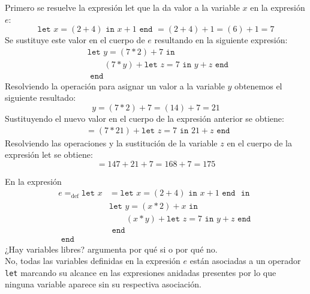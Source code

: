 \begin{exercise}
        Primero se resuelve la expresión let que la da valor a la variable $x$ en la expresión $e$:
        \[
            \texttt{let }x = (2 + 4) \texttt{ in } x+1 \texttt{ end } 
             = (2+4) + 1 
             = (6) + 1
             = 7
        \]
        Se sustituye este valor en el cuerpo de $e$ resultando en la siguiente expresión:
        \begin{align*}
           & \texttt{let }y =(7 \ast 2)+7  \texttt{ in } \\
            & \qquad (7\ast y) + \texttt{let }z=7 \texttt{ in } y+z \texttt{ end }\\
            & \texttt{ end }
        \end{align*}
        Resolviendo la operación para asignar un valor a la variable $y$ obtenemos el siguiente resultado: 
        \[
            y = (7 \ast 2) + 7 
            = (14) + 7 
            = 21
        \]
        Sustituyendo el nuevo valor en el cuerpo de la expresión anterior se obtiene:
        \begin{align*}
                 & = (7 \ast 21) + \texttt{let } z=7 \texttt{ in } 21 + z \texttt{ end }
        \end{align*}
        Resolviendo las operaciones y la sustitución de la variable $z$ en el cuerpo de la expresión let se obtiene:
        \[
            = 147 + 21 + 7
            = 168 + 7
            = 175
        \]

    \end{exercise}

    \begin{exercise}
        En la expresión
	 \begin{align*}
    	e=_{\text{def}}\texttt{let  }
    		x&= \texttt{let }x = (2 + 4) \texttt{ in } x+1 \texttt{ end }
    		\texttt{ in }\\
    		 &\texttt{let }y=(x \ast 2)+x 
    		 	\texttt{ in } \\
    		 & \qquad(x\ast y) + \texttt{let }z=7 \texttt{ in } 
    		 						y+z 
    		 				\texttt{ end }\\
    		 &\texttt{ end }\\
    	\texttt{ end }&
    \end{align*}
 	¿Hay variables libres? argumenta por qué si o por qué no. \\
    
        No, todas las variables definidas en la expresión $e$ están asociadas a un operador \texttt{let} marcando su alcance en las expresiones anidadas presentes por lo que ninguna variable aparece sin su respectiva asociación.
    \end{exercise}

